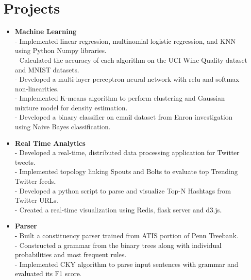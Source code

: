 \section {Projects}
\begin{itemize}


 \item \textbf{Machine Learning} \\
 - Implemented linear regression, multinomial logistic regression, and KNN using Python Numpy libraries. \\
 - Calculated the accuracy of each algorithm on the UCI Wine Quality dataset and MNIST datasets.\\
 - Developed a multi-layer perceptron neural network with relu and softmax non-linearities. \\
 - Implemented K-means algorithm to perform clustering and Gaussian mixture model for density estimation.\\
 - Developed a binary classifier on email dataset from Enron investigation using Naive Bayes classification.

\item \textbf{Real Time Analytics} \\
 - Developed a real-time, distributed data processing application for Twitter tweets.\\
 - Implemented topology linking Spouts and Bolts to evaluate top Trending Twitter feeds. \\
 - Developed a python script to parse and visualize Top-N Hashtags from Twitter URLs.\\
 - Created a real-time visualization using Redis, flask server and d3.js.
 
  \item \textbf{Parser} \\
 - Built a constituency parser trained from ATIS portion of Penn Treebank.\\
 - Constructed a grammar from the binary trees along with individual probabilities and most frequent rules. \\
 - Implemented CKY algorithm to parse input sentences with grammar and evaluated its F1 score.



\end{itemize}
